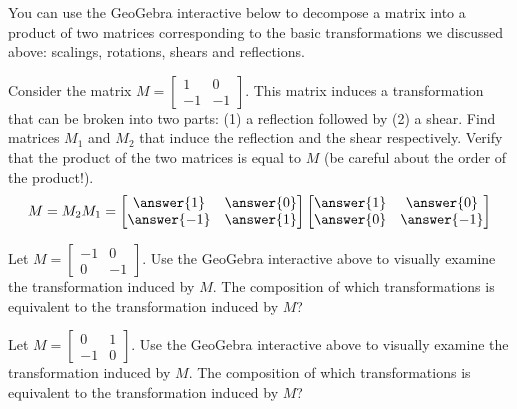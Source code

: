 \documentclass{ximera}
\begin{document}
\begin{exploration}\label{exp:matrixComp}
You can use the GeoGebra interactive below to decompose a matrix into a product of two matrices corresponding to the basic transformations we discussed above: scalings, rotations, shears and reflections.

Consider the matrix $M=\begin{bmatrix} 1 & 0\\-1 & -1\end{bmatrix}$.  This matrix induces a transformation that can be broken into two parts: (1) a reflection followed by (2) a shear.  Find matrices $M_1$ and $M_2$ that induce the reflection and the shear respectively.  Verify that the product of the two matrices is equal to $M$ (be careful about the order of the product!).
$$M=M_2M_1=\begin{bmatrix}\answer{1}&\answer{0}\\\answer{-1}&\answer{1}\end{bmatrix}\begin{bmatrix}\answer{1}&\answer{0}\\\answer{0}&\answer{-1}\end{bmatrix}$$


\begin{onlineOnly}
\begin{center}
\end{center}
\end{onlineOnly}

Let  $M=\begin{bmatrix}-1&0\\0&-1\end{bmatrix}$.  Use the GeoGebra interactive above to visually examine the transformation induced by $M$.  The composition of which transformations is equivalent to the transformation induced by $M$? 
\begin{multipleChoice}  
\end{multipleChoice} 

Let $M=\begin{bmatrix}0&1\\-1&0\end{bmatrix}$.  Use the GeoGebra interactive above to visually examine the transformation induced by $M$.
The composition of which transformations is equivalent to the transformation induced by $M$? 
\begin{multipleChoice}  
\end{multipleChoice} 
\end{exploration}
\end{document}
